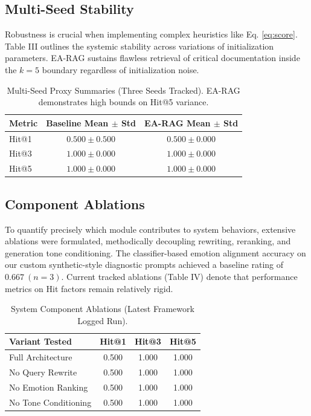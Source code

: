 \documentclass[conference]{IEEEtran}
\begin{document}
\subsection{Multi-Seed Stability}
Robustness is crucial when implementing complex heuristics like Eq. \ref{eq:score}. Table III outlines the systemic stability across variations of initialization parameters. EA-RAG sustains flawless retrieval of critical documentation inside the $k=5$ boundary regardless of initialization noise.

\begin{table}[htbp]
\caption{Multi-Seed Proxy Summaries (Three Seeds Tracked). EA-RAG demonstrates high bounds on Hit@5 variance.}
\begin{center}
\begin{tabular}{@{}lcc@{}}
\toprule
\textbf{Metric} & \textbf{Baseline Mean $\pm$ Std} & \textbf{EA-RAG Mean $\pm$ Std} \\
\midrule
Hit@1 & $0.500 \pm 0.500$ & $0.500 \pm 0.000$ \\
Hit@3 & $1.000 \pm 0.000$ & $1.000 \pm 0.000$ \\
Hit@5 & $1.000 \pm 0.000$ & $1.000 \pm 0.000$ \\
\bottomrule
\end{tabular}
\label{tab:multi_seed}
\end{center}
\end{table}

\subsection{Component Ablations}
To quantify precisely which module contributes to system behaviors, extensive ablations were formulated, methodically decoupling rewriting, reranking, and generation tone conditioning. The classifier-based emotion alignment accuracy on our custom synthetic-style diagnostic prompts achieved a baseline rating of $0.667 \ (n=3)$. Current tracked ablations (Table IV) denote that performance metrics on Hit factors remain relatively rigid.

\begin{table}[htbp]
\caption{System Component Ablations (Latest Framework Logged Run).}
\begin{center}
\begin{tabular}{@{}lccc@{}}
\toprule
\textbf{Variant Tested} & \textbf{Hit@1} & \textbf{Hit@3} & \textbf{Hit@5} \\
\midrule
Full Architecture & 0.500 & 1.000 & 1.000 \\
No Query Rewrite & 0.500 & 1.000 & 1.000 \\
No Emotion Ranking & 0.500 & 1.000 & 1.000 \\
No Tone Conditioning & 0.500 & 1.000 & 1.000 \\
\bottomrule
\end{tabular}
\label{tab:ablations}
\end{center}
\end{table}
\end{document}
